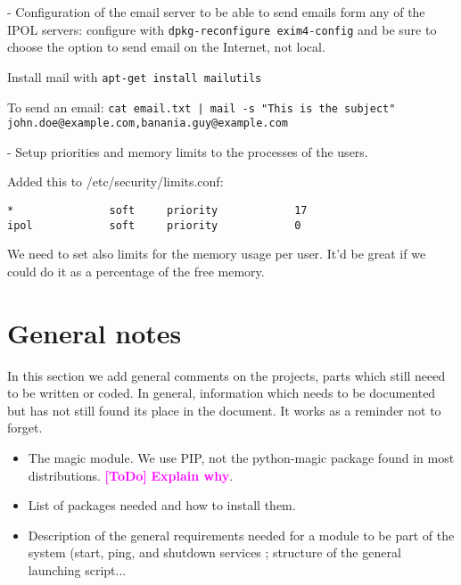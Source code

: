 \documentclass[a4paper,12pt]{article}
\newcommand{\ToDo}[1]{\textcolor{magenta}{\textbf{[ToDo]} \textbf{#1}}}
\begin{document}
- Configuration of the email server to be able to send emails form any of the IPOL servers: configure with {\tt dpkg-reconfigure exim4-config} and be sure to choose the option to send email on the Internet, not local.

Install mail with {\tt apt-get install mailutils}

To send an email: {\tt cat email.txt | mail -s "This is the subject" john.doe@example.com,banania.guy@example.com}


- Setup priorities and memory limits to the processes of the users.

Added this to /etc/security/limits.conf:
\begin{verbatim}
*               soft     priority            17
ipol            soft     priority            0
\end{verbatim}

We need to set also limits for the memory usage per user. It'd be great if we could do it as a percentage of the free memory.


%
%
%



\section{General notes}
In this section we add general comments on the projects, parts which still neeed to be written or coded. In general, information which needs to be documented but has not still found its place in the document. It works as a reminder not to forget.

\begin{itemize}
  \item The magic module. We use PIP, not the python-magic package found in most distributions. \ToDo{Explain why}.
  \item List of packages needed and how to install them.
  \item Description of the general requirements needed for a module to be part of the system (start, ping, and shutdown services ; structure of the general launching script...
\end{itemize}
\end{document}
